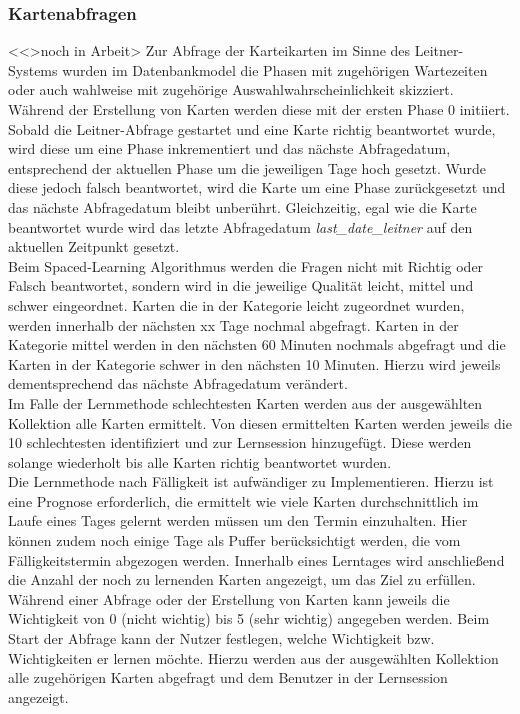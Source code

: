 \subsubsection{Kartenabfragen}
<<>noch in Arbeit>
Zur Abfrage der Karteikarten im Sinne des Leitner-Systems wurden im Datenbankmodel die Phasen mit zugehörigen Wartezeiten oder auch wahlweise mit zugehörige Auswahlwahrscheinlichkeit skizziert. Während der Erstellung von Karten werden diese mit der ersten Phase 0 initiiert. Sobald die Leitner-Abfrage gestartet und eine Karte richtig beantwortet wurde, wird diese um eine Phase inkrementiert und das nächste Abfragedatum, entsprechend der aktuellen Phase um die jeweiligen Tage hoch gesetzt. Wurde diese jedoch falsch beantwortet, wird die Karte um eine Phase zurückgesetzt und das nächste Abfragedatum bleibt unberührt. Gleichzeitig, egal wie die Karte beantwortet wurde wird das letzte Abfragedatum \emph{last{\_}date{\_}leitner} auf den aktuellen Zeitpunkt gesetzt. \\

Beim Spaced-Learning Algorithmus werden die Fragen nicht mit Richtig oder Falsch beantwortet, sondern wird in die jeweilige Qualität leicht, mittel und schwer eingeordnet. Karten die in der Kategorie leicht zugeordnet wurden, werden innerhalb der nächsten xx Tage nochmal abgefragt. Karten in der Kategorie mittel werden in den nächsten 60 Minuten nochmals abgefragt und die Karten in der Kategorie schwer in den nächsten 10 Minuten. Hierzu wird jeweils dementsprechend das nächste Abfragedatum verändert. \\

Im Falle der Lernmethode \glqq{}schlechtesten Karten \glqq{} werden aus der ausgewählten Kollektion alle Karten ermittelt. Von diesen ermittelten Karten werden jeweils die 10 schlechtesten identifiziert und zur Lernsession hinzugefügt. Diese werden solange wiederholt bis alle Karten richtig beantwortet wurden. \\

Die Lernmethode nach Fälligkeit ist aufwändiger zu Implementieren. Hierzu ist eine Prognose erforderlich, die ermittelt wie viele Karten durchschnittlich im Laufe eines Tages gelernt werden müssen um den Termin einzuhalten. Hier können zudem noch einige Tage als Puffer berücksichtigt werden, die vom Fälligkeitstermin abgezogen werden. Innerhalb eines Lerntages wird anschließend die Anzahl der noch zu lernenden Karten angezeigt, um das Ziel zu erfüllen. \\

Während einer Abfrage oder der Erstellung von Karten kann jeweils die Wichtigkeit von 0 (nicht wichtig) bis 5 (sehr wichtig) angegeben werden. Beim Start der Abfrage kann der Nutzer festlegen, welche Wichtigkeit bzw. Wichtigkeiten er lernen möchte. Hierzu werden aus der ausgewählten Kollektion alle zugehörigen Karten abgefragt und dem Benutzer in der Lernsession angezeigt. \\

